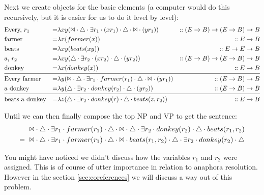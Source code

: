 \documentclass[12pt]{article}
\begin{document}
Next we create objects for the basic elements (a computer would do this recursively, but it is easier for us to do it level by level):
\begin{equation*}\begin{aligned}
&\text{Every, $r_1$}&=& \lambda xy(\Bowtie\cdot\triangle\cdot\exists r_1\cdot (xr_1)\cdot\triangle\cdot\Bowtie\cdot (yr_1)) & :: (E\rightarrow B)\rightarrow(E\rightarrow B)\rightarrow B\\
&\text{farmer}&=& \lambda x(farmer(x)) & :: E\rightarrow B\\
&\text{beats}&=& \lambda xy(beats(xy)) & :: E\rightarrow E\rightarrow B\\
&\text{a, $r_2$}&=& \lambda xy(\triangle\cdot\exists r_2\cdot (xr_2)\cdot\triangle\cdot (yr_2)) & :: (E\rightarrow B)\rightarrow(E\rightarrow B)\rightarrow B\\
&\text{donkey}&=& \lambda x(donkey(x)) & :: E\rightarrow B\\
\midrule
&\text{Every farmer}&=& \lambda y(\Bowtie\cdot\triangle\cdot\exists r_1\cdot farmer(r_1)\cdot\triangle\cdot\Bowtie\cdot (yr_1)) & :: (E\rightarrow B)\rightarrow B\\
&\text{a donkey}&=& \lambda y(\triangle\cdot\exists r_2\cdot donkey(r_2)\cdot\triangle\cdot (yr_2)) & :: (E\rightarrow B)\rightarrow B\\
\midrule
&\text{beats a donkey}&=& \lambda z(\triangle\cdot\exists r_2\cdot donkey(r)\cdot\triangle\cdot beats(z,r_2)) & :: E\rightarrow B\\
\end{aligned}\end{equation*}

Until we can then finally compose the top NP and VP to get the sentence:
\begin{equation*}\begin{aligned}
&\Bowtie\cdot\triangle\cdot\exists r_1\cdot farmer(r_1)\cdot\triangle\cdot\Bowtie\cdot \triangle\cdot\exists r_2\cdot donkey(r_2)\cdot\triangle\cdot beats(r_1,r_2)\\
=\text{ }&\Bowtie\cdot\triangle\cdot\exists r_1\cdot farmer(r_1)\cdot\triangle\cdot\Bowtie\cdot beats(r_1,r_2)\cdot \triangle\cdot\exists r_2\cdot donkey(r_2)\cdot\triangle
\end{aligned}\end{equation*}

You might have noticed we didn't discuss how the variables $r_1$ and $r_2$ were assigned. This is of course of utter importance in relation to anaphora resolution. However in the section \ref{sec:coreferences} we will discuss a way out of this problem.
\end{document}
